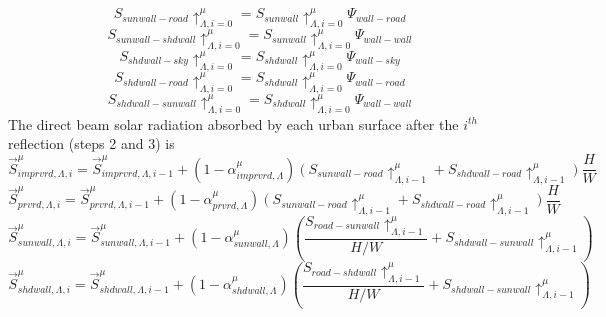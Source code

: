 \documentclass[12pt,authoryear]{elsarticle}
\numberwithin{equation}{section} %
\begin{document}
\begin{equation}
S_{sunwall-road}\uparrow_{\Lambda,i=0}^{\mu}=S_{sunwall}\uparrow_{\Lambda,i=0}^{\mu}\Psi_{wall-road}
\end{equation}
\begin{equation}
S_{sunwall-shdwall}\uparrow_{\Lambda,i=0}^{\mu}=S_{sunwall}\uparrow_{\Lambda,i=0}^{\mu}\Psi_{wall-wall}
\end{equation}
\begin{equation}
S_{shdwall-sky}\uparrow_{\Lambda,i=0}^{\mu}=S_{shdwall}\uparrow_{\Lambda,i=0}^{\mu}\Psi_{wall-sky}
\end{equation}
\begin{equation}
S_{shdwall-road}\uparrow_{\Lambda,i=0}^{\mu}=S_{shdwall}\uparrow_{\Lambda,i=0}^{\mu}\Psi_{wall-road}
\end{equation}
\begin{equation}
S_{shdwall-sunwall}\uparrow_{\Lambda,i=0}^{\mu}=S_{shdwall}\uparrow_{\Lambda,i=0}^{\mu}\Psi_{wall-wall}
\end{equation}
The direct beam solar radiation absorbed by each urban surface after the $i^{th}$ reflection (steps 2 and 3) is
\begin{equation}
\label{eq:direct_beam_solar_radiation}
\overrightarrow{S}_{imprvrd,\Lambda,i}^{\mu} = \overrightarrow{S}_{imprvrd,\Lambda,i-1}^{\mu} + (1-\alpha_{imprvrd,\Lambda}^{\mu})(S_{sunwall-road}\uparrow_{\Lambda,i-1}^{\mu}+S_{shdwall-road}\uparrow_{\Lambda,i-1}^{\mu})\frac{H}{W}
\end{equation}
\begin{equation}
\overrightarrow{S}_{prvrd,\Lambda,i}^{\mu} = \overrightarrow{S}_{prvrd,\Lambda,i-1}^{\mu} + (1-\alpha_{prvrd,\Lambda}^{\mu})(S_{sunwall-road}\uparrow_{\Lambda,i-1}^{\mu}+S_{shdwall-road}\uparrow_{\Lambda,i-1}^{\mu})\frac{H}{W}
\end{equation}
\begin{equation}
\label{eq:absorbed_solar_radiation_direct_sunwall}
\overrightarrow{S}_{sunwall,\Lambda,i}^{\mu} = \overrightarrow{S}_{sunwall,\Lambda,i-1}^{\mu} + (1-\alpha_{sunwall,\Lambda}^{\mu})\left(\frac{S_{road-sunwall}\uparrow_{\Lambda,i-1}^{\mu}}{H/W}+S_{shdwall-sunwall}\uparrow_{\Lambda,i-1}^{\mu}\right)
\end{equation}
\begin{equation}
\label{eq:absorbed_solar_radiation_direct_shdwall}
\overrightarrow{S}_{shdwall,\Lambda,i}^{\mu} = \overrightarrow{S}_{shdwall,\Lambda,i-1}^{\mu} + (1-\alpha_{shdwall,\Lambda}^{\mu})\left(\frac{S_{road-shdwall}\uparrow_{\Lambda,i-1}^{\mu}}{H/W}+S_{shdwall-sunwall}\uparrow_{\Lambda,i-1}^{\mu}\right)
\end{equation}
\end{document}
